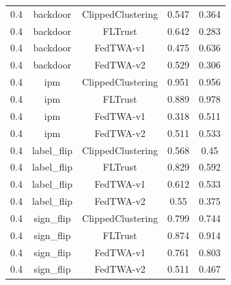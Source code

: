 \begin{tabular}{lcccc}
0.4 & backdoor & ClippedClustering & 0.547 & 0.364 \\
0.4 & backdoor & FLTrust & 0.642 & 0.283 \\
0.4 & backdoor & FedTWA-v1 & 0.475 & 0.636 \\
0.4 & backdoor & FedTWA-v2 & 0.529 & 0.306 \\
0.4 & ipm & ClippedClustering & 0.951 & 0.956 \\
0.4 & ipm & FLTrust & 0.889 & 0.978 \\
0.4 & ipm & FedTWA-v1 & 0.318 & 0.511 \\
0.4 & ipm & FedTWA-v2 & 0.511 & 0.533 \\
0.4 & label\_flip & ClippedClustering & 0.568 & 0.45 \\
0.4 & label\_flip & FLTrust & 0.829 & 0.592 \\
0.4 & label\_flip & FedTWA-v1 & 0.612 & 0.533 \\
0.4 & label\_flip & FedTWA-v2 & 0.55 & 0.375 \\
0.4 & sign\_flip & ClippedClustering & 0.799 & 0.744 \\
0.4 & sign\_flip & FLTrust & 0.874 & 0.914 \\
0.4 & sign\_flip & FedTWA-v1 & 0.761 & 0.803 \\
0.4 & sign\_flip & FedTWA-v2 & 0.511 & 0.467 \\
\bottomrule
\end{tabular}